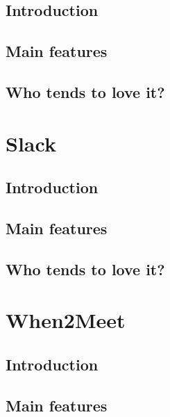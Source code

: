 \documentclass[
]{book}
\begin{document}
\hypertarget{introduction-7}{%
\subsection{Introduction}\label{introduction-7}}

\hypertarget{main-features-6}{%
\subsection{Main features}\label{main-features-6}}

\hypertarget{who-tends-to-love-it-6}{%
\subsection{Who tends to love it?}\label{who-tends-to-love-it-6}}

\hypertarget{slack}{%
\section{Slack}\label{slack}}

\hypertarget{introduction-8}{%
\subsection{Introduction}\label{introduction-8}}

\hypertarget{main-features-7}{%
\subsection{Main features}\label{main-features-7}}

\hypertarget{who-tends-to-love-it-7}{%
\subsection{Who tends to love it?}\label{who-tends-to-love-it-7}}

\hypertarget{when2meet}{%
\section{When2Meet}\label{when2meet}}

\hypertarget{introduction-9}{%
\subsection{Introduction}\label{introduction-9}}

\hypertarget{main-features-8}{%
\subsection{Main features}\label{main-features-8}}
\end{document}
